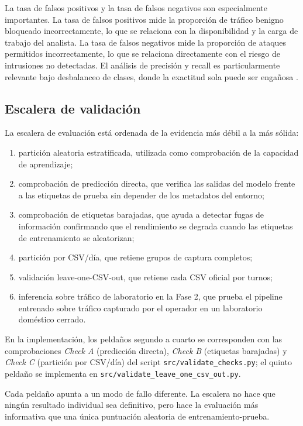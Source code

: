 La tasa de falsos positivos y la tasa de falsos negativos son especialmente importantes. La tasa de falsos positivos mide la proporción de tráfico benigno bloqueado incorrectamente, lo que se relaciona con la disponibilidad y la carga de trabajo del analista. La tasa de falsos negativos mide la proporción de ataques permitidos incorrectamente, lo que se relaciona directamente con el riesgo de intrusiones no detectadas. El análisis de precisión y recall es particularmente relevante bajo desbalanceo de clases, donde la exactitud sola puede ser engañosa \parencite{Fawcett2006ROC,Saito2015PRROC}.

\subsection{Escalera de validación}
La escalera de evaluación está ordenada de la evidencia más débil a la más sólida:
\begin{enumerate}
    \item partición aleatoria estratificada, utilizada como comprobación de la capacidad de aprendizaje;
    \item comprobación de predicción directa, que verifica las salidas del modelo frente a las etiquetas de prueba sin depender de los metadatos del entorno;
    \item comprobación de etiquetas barajadas, que ayuda a detectar fugas de información confirmando que el rendimiento se degrada cuando las etiquetas de entrenamiento se aleatorizan;
    \item partición por CSV/día, que retiene grupos de captura completos;
    \item validación leave-one-CSV-out, que retiene cada CSV oficial por turnos;
    \item inferencia sobre tráfico de laboratorio en la Fase 2, que prueba el pipeline entrenado sobre tráfico capturado por el operador en un laboratorio doméstico cerrado.
\end{enumerate}

En la implementación, los peldaños segundo a cuarto se corresponden con las comprobaciones \emph{Check A} (predicción directa), \emph{Check B} (etiquetas barajadas) y \emph{Check C} (partición por CSV/día) del script \texttt{src/validate\_checks.py}; el quinto peldaño se implementa en \texttt{src/validate\_leave\_one\_csv\_out.py}.

Cada peldaño apunta a un modo de fallo diferente. La escalera no hace que ningún resultado individual sea definitivo, pero hace la evaluación más informativa que una única puntuación aleatoria de entrenamiento-prueba.

